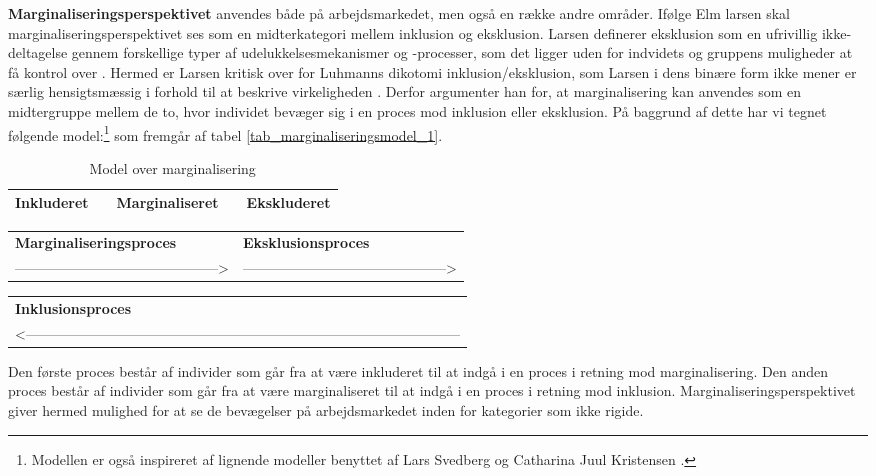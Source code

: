 \textbf{Marginaliseringsperspektivet} anvendes både på arbejdsmarkedet, men også en række andre områder. Ifølge Elm larsen skal marginaliseringsperspektivet ses som en midterkategori mellem inklusion og eksklusion. Larsen definerer eksklusion som en ufrivillig ikke-deltagelse gennem forskellige typer af udelukkelsesmekanismer og -processer, som det ligger uden for indvidets og gruppens muligheder at få kontrol over \parencite[137]{Larsen2009}. Hermed er Larsen kritisk over for Luhmanns dikotomi inklusion/eksklusion, som Larsen i dens binære form ikke mener er særlig hensigtsmæssig i forhold til at beskrive virkeligheden \parencite[130]{Larsen2009}. Derfor argumenter han for, at marginalisering kan anvendes som en midtergruppe mellem de to, hvor individet bevæger sig i en proces mod inklusion eller eksklusion. På baggrund af dette har vi tegnet følgende model:\footnote{Modellen er også inspireret af lignende modeller benyttet af Lars Svedberg \parencite[44]{Svedberg1995} og Catharina Juul Kristensen \parencite[18]{Kristensen1999}.} som fremgår af tabel \ref{tab_marginaliseringsmodel_1}. 
% 
\begin{table}[H] \centering
\caption{Model over marginalisering}
\label{tab_marginaliseringsmodel_3}
\begin{tabular}{@{} m{} c m{} c m{} @{}} \toprule
\textbf{Inkluderet} & & \textbf{Marginaliseret} & & \textbf{Ekskluderet} \\ \midrule
\end{tabular} \end{table} %
\begin{table}[H] \centering
\label{tab_marginaliseringsmodel}
\begin{tabular}{@{} m{} m{} @{}} 
  \textbf{Marginaliseringsproces} & \textbf{Eksklusionsproces} \\  
  --------------------------------------------> & --------------------------------------------> \\ 
\end{tabular} \end{table} %
\begin{table}[H] \centering
\label{tab_marginaliseringsmodel}
\begin{tabular}{@{} m{} @{}} 
  \textbf{Inklusionsproces} \\  
  <--------------------------------------------------------------------------------------------- \\ \bottomrule
\end{tabular} \end{table}
%
Den første proces består af individer som går fra at være inkluderet til at indgå i en proces i retning mod marginalisering. Den anden proces består af individer som går fra at være marginaliseret til at indgå i en proces i retning mod inklusion. Marginaliseringsperspektivet giver hermed mulighed for at se de  bevægelser på arbejdsmarkedet inden for kategorier som ikke rigide.

